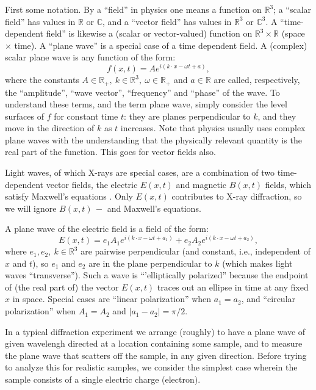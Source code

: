 \documentclass[reqno]{stml-l}
\theoremstyle{plain}
\theoremstyle{definition}
\numberwithin{equation}{chapter}
\begin{document}
First some notation. By a ``field'' in physics one means a function on $\mathbb{R}^{3}$; a ``scalar field'' has values in $\mathbb{R}$ or $\mathbb{C}$, and a ``vector field'' has values in $\mathbb{R}^{3}$ or $\mathbb{C}^{3}$. A ``time-dependent field'' is likewise a (scalar or vector-valued) function on $\mathbb{R}^{3}\times \mathbb{R}$ (space $\times$ time). A ``plane wave'' is a special case of a time dependent field. A (complex) scalar plane wave is any function of the form:
\begin{equation}
f(x, t)=Ae^{i(k\cdot x-\omega t+a)},\label{ch02:eqn02}
\end{equation}
where the constants $A\in \mathbb{R}_{+},\ k\in \mathbb{R}^{3},\ \omega \in \mathbb{R}_+$ and $a\in \mathbb{R}$ are called, respectively, the ``amplitude'', ``wave vector'', ``frequency'' and ``phase'' of the wave. To understand these terms, and the term plane wave, simply consider the level surfaces of $f$ for constant time $t$: they are planes perpendicular to $k$, and they move in the direction of $k$ as $t$ increases. Note that physics usually uses complex plane waves with the understanding that the physically relevant quantity is the real part of the function. This goes for vector fields also.

Light waves, of which X-rays are special cases, are a combination of two time-dependent vector fields, the electric $E(x, t)$ and magnetic $B(x, t)$ fields, which satisfy Maxwell's equations \cite{bib:EiI}. Only $E(x, t)$ contributes to X-ray diffraction, so we will ignore $B(x, t)\,-$ and Maxwell's equations.

A plane wave of the electric field is a field of the form:
\begin{equation}
E(x, t)=e_{1}A_{1}e^{i(k\cdot x-\omega t+a_{1})}+e_{2}A_{2}e^{i(k\cdot x-\omega t+a_{2})},\label{ch02:eqn2.2}
\end{equation}
where $e_{1},e_{2},\ k\in \mathbb{R}^{3}$ are pairwise perpendicular (and constant, i.e., independent of $x$ and $t$), so $e_{1}$ and $e_{2}$ are in the plane perpendicular to $k$ (which makes light waves ``transverse''). Such a wave is ``'elliptically polarized'' because the endpoint of (the real part of) the vector $E(x, t)$ traces out an ellipse in time at any fixed $x$ in space. Special cases are ``linear polarization'' when $a_{1}=a_{2}$, and ``circular polarization'' when $A_{1}=A_{2}$ and $|a_{1}-a_{2}|=\pi/2$.

In a typical diffraction experiment we arrange (roughly) to have a plane wave of given wavelengh directed at a location containing some sample, and to measure the plane wave that scatters off the sample, in any given direction. Before trying to analyze this for realistic samples, we consider the simplest case wherein the sample consists of a single electric charge (electron).
\end{document}
